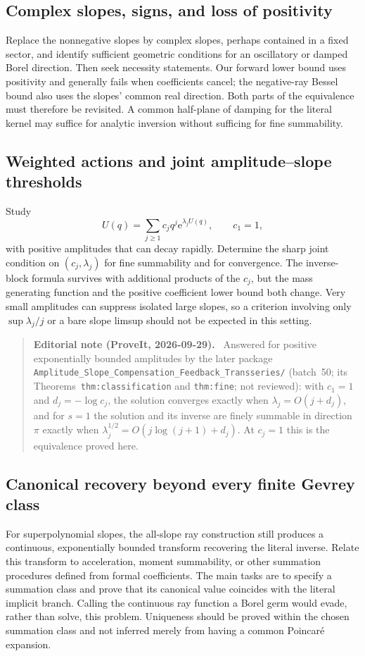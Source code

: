 \documentclass[11pt,a4paper]{article}
\numberwithin{equation}{section}
\theoremstyle{definition}
\theoremstyle{remark}
\newcommand{\ee}{\mathrm e}
\newenvironment{ednote}{\par\smallskip\begin{quote}\small\raggedright\textbf{Editorial note (ProveIt, 2026-09-29).}\ }{\end{quote}\smallskip}
\begin{document}
\subsection{Complex slopes, signs, and loss of positivity}
Replace the nonnegative slopes by complex slopes, perhaps contained in a
fixed sector, and identify sufficient geometric conditions for an
oscillatory or damped Borel direction.  Then seek necessity statements.
Our forward lower bound uses positivity and generally fails when
coefficients cancel; the negative-ray Bessel bound also uses the slopes'
common real direction.  Both parts of the equivalence must therefore be
revisited.  A common half-plane of damping for the literal kernel may
suffice for analytic inversion without sufficing for fine summability.

\subsection{Weighted actions and joint amplitude--slope thresholds}
Study
\[
 U(q)=\sum_{j\ge1}c_jq^j\ee^{\lambda_jU(q)},\qquad c_1=1,
\]
with positive amplitudes that can decay rapidly.  Determine the sharp
joint condition on $(c_j,\lambda_j)$ for fine summability and for
convergence.  The inverse-block formula survives with additional products
of the $c_j$, but the mass generating function and the positive coefficient
lower bound both change.  Very small amplitudes can suppress isolated
large slopes, so a criterion involving only $\sup\lambda_j/j$ or a bare
slope limsup should not be expected in this setting.
\begin{ednote}
Answered for positive exponentially bounded amplitudes by the later
package \nolinkurl{Amplitude_Slope_Compensation_Feedback_Transseries/}
(batch~50; its Theorems~\texttt{thm:classification} and
\texttt{thm:fine}; not reviewed): with $c_1=1$ and $d_j=-\log c_j$, the
solution converges exactly when $\lambda_j=O(j+d_j)$, and for $s=1$ the
solution and its inverse are finely summable in direction $\pi$ exactly when
$\lambda_j^{1/2}=O(j\log(j+1)+d_j)$. At $c_j=1$ this is the equivalence
proved here.
\end{ednote}

\subsection{Canonical recovery beyond every finite Gevrey class}
For superpolynomial slopes, the all-slope ray construction still produces
a continuous, exponentially bounded transform recovering the literal
inverse.  Relate this transform to acceleration, moment summability, or
other summation procedures defined from formal coefficients.  The main
tasks are to specify a summation class and prove that its canonical value
coincides with the literal implicit branch.  Calling the continuous ray
function a Borel germ would evade, rather than solve, this problem.
Uniqueness should be proved within the chosen summation class and not
inferred merely from having a common Poincar\'e expansion.
\end{document}
